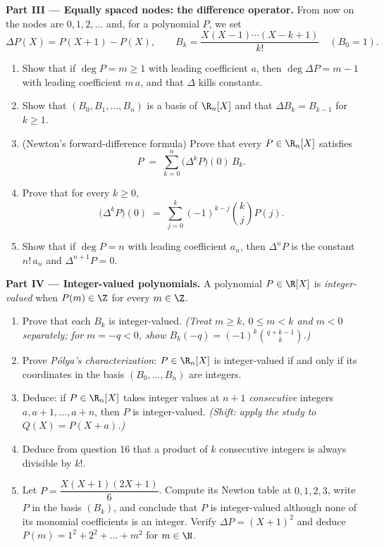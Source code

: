 \begin{problem}
\medskip
\noindent\textbf{Part III --- Equally spaced nodes: the difference
operator.} From now on the nodes are $0, 1, 2, \dots$ and, for a
polynomial $P$, we set
\[
\Delta P(X) = P(X + 1) - P(X),
\qquad
B_k = \frac{X(X-1)\cdots(X-k+1)}{k!} \quad (B_0 = 1).
\]
\begin{enumerate}[resume]
  \item Show that if $\deg P = m \geq 1$ with leading coefficient
        $a$, then $\deg \Delta P = m - 1$ with leading coefficient
        $m\,a$, and that $\Delta$ kills constants.
  \item Show that $(B_0, B_1, \dots, B_n)$ is a basis of
        $\R_n[X]$ and that $\Delta B_k = B_{k-1}$ for $k \geq 1$.
  \item (Newton's forward-difference formula) Prove that every $P
        \in \R_n[X]$ satisfies
        \[
        P \;=\; \sum_{k=0}^{n} \bigl(\Delta^{k} P\bigr)(0)\, B_k .
        \]
  \item Prove that for every $k \geq 0$,
        \[
        \bigl(\Delta^{k} P\bigr)(0) \;=\;
        \sum_{j=0}^{k} (-1)^{k-j} \binom{k}{j} P(j) .
        \]
  \item Show that if $\deg P = n$ with leading coefficient $a_n$,
        then $\Delta^{n} P$ is the constant $n!\,a_n$ and
        $\Delta^{n+1} P = 0$.
\end{enumerate}

\medskip
\noindent\textbf{Part IV --- Integer-valued polynomials.} A
polynomial $P \in \R[X]$ is \emph{integer-valued} when $P(m) \in
\Z$ for every $m \in \Z$.
\begin{enumerate}[resume]
  \item Prove that each $B_k$ is integer-valued. \emph{(Treat $m
        \geq k$, $0 \leq m < k$ and $m < 0$ separately; for $m =
        -q < 0$, show $B_k(-q) = (-1)^k \binom{q + k - 1}{k}$.)}
  \item Prove \emph{P\'olya's characterization}: $P \in \R_n[X]$
        is integer-valued if and only if its coordinates in the
        basis $(B_0, \dots, B_n)$ are integers.
  \item Deduce: if $P \in \R_n[X]$ takes integer values at $n + 1$
        \emph{consecutive} integers $a, a+1, \dots, a+n$, then $P$
        is integer-valued. \emph{(Shift: apply the study to $Q(X)
        = P(X + a)$.)}
  \item Deduce from question 16 that a product of $k$ consecutive
        integers is always divisible by $k!$.
  \item Let $P = \dfrac{X(X+1)(2X+1)}{6}$. Compute its Newton
        table at $0, 1, 2, 3$, write $P$ in the basis $(B_k)$, and
        conclude that $P$ is integer-valued although none of its
        monomial coefficients is an integer. Verify $\Delta P =
        (X+1)^2$ and deduce $P(m) = 1^2 + 2^2 + \dots + m^2$ for
        $m \in \N$.
\end{enumerate}


\end{problem}
